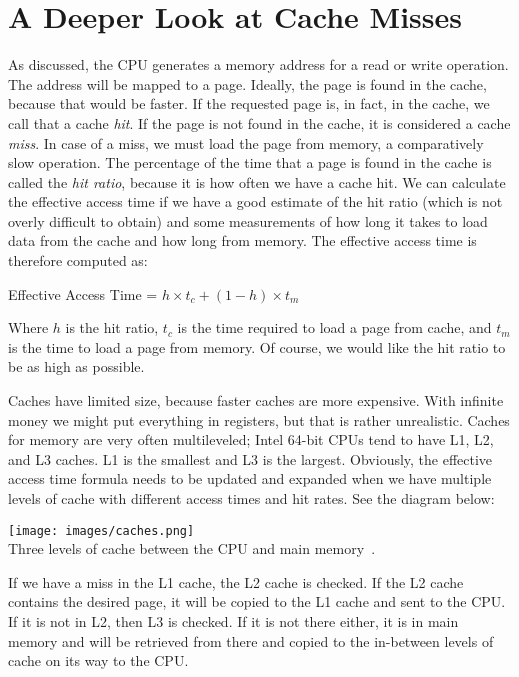 \section*{A Deeper Look at Cache Misses}

As discussed, the CPU generates a memory address for a read or write operation. The address will be mapped to a page. Ideally, the page is found in the cache, because that would be faster. If the requested page is, in fact,  in the cache, we call that a cache \textit{hit}. If the page is not found in the cache, it is considered a cache \textit{miss}. In case of a miss, we must load the page from memory, a comparatively slow operation. The percentage of the time that a page is found in the cache is called the \textit{hit ratio}, because it is how often we have a cache hit. We can calculate the effective access time if we have a good estimate of the hit ratio (which is not overly difficult to obtain) and some measurements of how long it takes to load data from the cache and  how long from memory. The effective access time is therefore computed as:

\begin{center}
Effective Access Time = $h \times t_{c} + (1-h) \times t_{m}$
\end{center}

Where $h$ is the hit ratio, $t_{c}$ is the time required to load a page from cache, and $t_{m}$ is the time to load a page from memory. Of course, we would like the hit ratio to be as high as possible. 

Caches have limited size, because faster caches are more expensive. With infinite money we might put everything in registers, but that is rather unrealistic. Caches for memory are very often multileveled; Intel 64-bit CPUs tend to have L1, L2, and L3 caches. L1 is the smallest and L3 is the largest. Obviously, the effective access time formula needs to be updated and expanded when we have multiple levels of cache with different access times and hit rates. See the diagram below:

\begin{center}
\texttt{[image: images/caches.png]}\\
Three levels of cache between the CPU and main memory~\cite{osi}.
\end{center}

If we have a miss in the L1 cache, the L2 cache is checked. If the L2 cache contains the desired page, it will be copied to the L1 cache and sent to the CPU. If it is not in L2, then L3 is checked. If it is not there either, it is in main memory and will be retrieved from there and copied to the in-between levels of cache on its way to the CPU.

